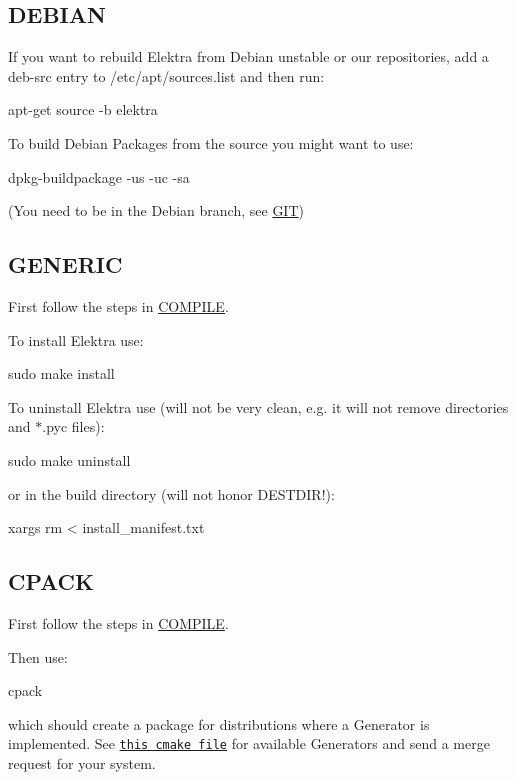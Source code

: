 \subsection*{D\+E\+B\+I\+A\+N}

If you want to rebuild Elektra from Debian unstable or our repositories, add a {\ttfamily deb-\/src} entry to {\ttfamily /etc/apt/sources.list} and then run\+: \begin{DoxyVerb}    apt-get source -b elektra
\end{DoxyVerb}


To build Debian Packages from the source you might want to use\+: \begin{DoxyVerb}    dpkg-buildpackage -us -uc -sa
\end{DoxyVerb}


(You need to be in the Debian branch, see \hyperlink{doc_GIT_md}{G\+I\+T})

\subsection*{G\+E\+N\+E\+R\+I\+C}

First follow the steps in \hyperlink{doc_COMPILE_md}{C\+O\+M\+P\+I\+L\+E}.

To install Elektra use\+: \begin{DoxyVerb}    sudo make install
\end{DoxyVerb}


To uninstall Elektra use (will not be very clean, e.\+g. it will not remove directories and {\ttfamily $\ast$.pyc} files)\+: \begin{DoxyVerb}    sudo make uninstall
\end{DoxyVerb}


or in the build directory (will not honor D\+E\+S\+T\+D\+I\+R!)\+: \begin{DoxyVerb}    xargs rm < install_manifest.txt
\end{DoxyVerb}


\subsection*{C\+P\+A\+C\+K}

First follow the steps in \hyperlink{doc_COMPILE_md}{C\+O\+M\+P\+I\+L\+E}.

Then use\+: \begin{DoxyVerb}    cpack
\end{DoxyVerb}


which should create a package for distributions where a Generator is implemented. See \href{/home/markus/Projekte/Elektra/current/cmake/ElektraPackaging.cmake}{\tt this cmake file} for available Generators and send a merge request for your system.

